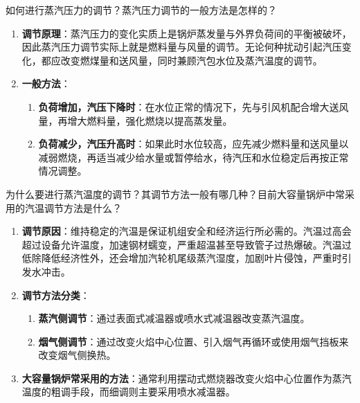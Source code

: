 \begin{problem}
如何进行蒸汽压力的调节？蒸汽压力调节的一般方法是怎样的？
\end{problem}

\begin{solution}
\begin{enumerate}
  \item \textbf{调节原理}：蒸汽压力的变化实质上是锅炉蒸发量与外界负荷间的平衡被破坏，因此蒸汽压力调节实际上就是燃料量与风量的调节。无论何种扰动引起汽压变化，都应改变燃煤量和送风量，同时兼顾汽包水位及蒸汽温度的调节。
  \item \textbf{一般方法}：
  \begin{enumerate}
    \item \textbf{负荷增加，汽压下降时}：在水位正常的情况下，先与引风机配合增大送风量，再增大燃料量，强化燃烧以提高蒸发量。
    \item \textbf{负荷减少，汽压升高时}：如果此时水位较高，应先减少燃料量和送风量以减弱燃烧，再适当减少给水量或暂停给水，待汽压和水位稳定后再按正常情况调整。
  \end{enumerate}
\end{enumerate}
\end{solution}

\begin{problem}
为什么要进行蒸汽温度的调节？其调节方法一般有哪几种？目前大容量锅炉中常采用的汽温调节方法是什么？
\end{problem}

\begin{solution}
\begin{enumerate}
  \item \textbf{调节原因}：维持稳定的汽温是保证机组安全和经济运行所必需的。汽温过高会超过设备允许温度，加速钢材蠕变，严重超温甚至导致管子过热爆破。汽温过低除降低经济性外，还会增加汽轮机尾级蒸汽湿度，加剧叶片侵蚀，严重时引发水冲击。
  \item \textbf{调节方法分类}：
  \begin{enumerate}
    \item \textbf{蒸汽侧调节}：通过表面式减温器或喷水式减温器改变蒸汽温度。
    \item \textbf{烟气侧调节}：通过改变火焰中心位置、引入烟气再循环或使用烟气挡板来改变烟气侧换热。
  \end{enumerate}
  \item \textbf{大容量锅炉常采用的方法}：通常利用摆动式燃烧器改变火焰中心位置作为蒸汽温度的粗调手段，而细调则主要采用喷水减温器。
\end{enumerate}
\end{solution}

